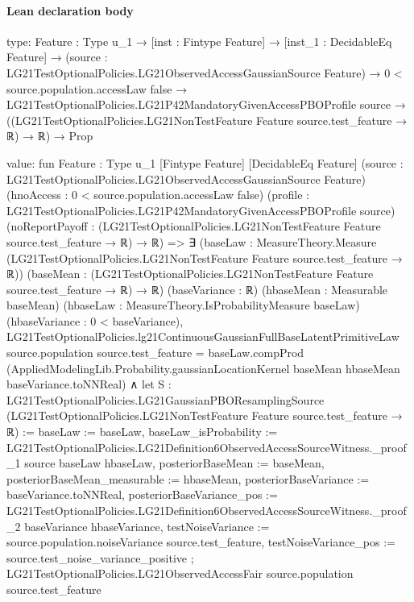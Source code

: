 \documentclass[10pt]{article}
\begin{document}
\paragraph{Lean declaration body}
\begin{ReviewVerbatim}
type:
{Feature : Type u_1} →
  [inst : Fintype Feature] →
    [inst_1 : DecidableEq Feature] →
      (source : LG21TestOptionalPolicies.LG21ObservedAccessGaussianSource Feature) →
        0 < source.population.accessLaw {false} →
          LG21TestOptionalPolicies.LG21P42MandatoryGivenAccessPBOProfile source →
            ((LG21TestOptionalPolicies.LG21NonTestFeature Feature source.test_feature → ℝ) → ℝ) → Prop

value:
fun {Feature : Type u_1} [Fintype Feature] [DecidableEq Feature]
    (source : LG21TestOptionalPolicies.LG21ObservedAccessGaussianSource Feature)
    (hnoAccess : 0 < source.population.accessLaw {false})
    (profile : LG21TestOptionalPolicies.LG21P42MandatoryGivenAccessPBOProfile source)
    (noReportPayoff : (LG21TestOptionalPolicies.LG21NonTestFeature Feature source.test_feature → ℝ) → ℝ) =>
  ∃ (baseLaw : MeasureTheory.Measure (LG21TestOptionalPolicies.LG21NonTestFeature Feature source.test_feature → ℝ))
    (baseMean : (LG21TestOptionalPolicies.LG21NonTestFeature Feature source.test_feature → ℝ) → ℝ) (baseVariance : ℝ)
    (hbaseMean : Measurable baseMean) (hbaseLaw : MeasureTheory.IsProbabilityMeasure baseLaw) (hbaseVariance :
    0 < baseVariance),
    LG21TestOptionalPolicies.lg21ContinuousGaussianFullBaseLatentPrimitiveLaw source.population source.test_feature =
        baseLaw.compProd
          (AppliedModelingLib.Probability.gaussianLocationKernel baseMean hbaseMean baseVariance.toNNReal) ∧
      let S :
        LG21TestOptionalPolicies.LG21GaussianPBOResamplingSource
          (LG21TestOptionalPolicies.LG21NonTestFeature Feature source.test_feature → ℝ) :=
        { baseLaw := baseLaw,
          baseLaw_isProbability :=
            LG21TestOptionalPolicies.LG21Definition6ObservedAccessSourceWitness._proof_1 source baseLaw hbaseLaw,
          posteriorBaseMean := baseMean, posteriorBaseMean_measurable := hbaseMean,
          posteriorBaseVariance := baseVariance.toNNReal,
          posteriorBaseVariance_pos :=
            LG21TestOptionalPolicies.LG21Definition6ObservedAccessSourceWitness._proof_2 baseVariance hbaseVariance,
          testNoiseVariance := source.population.noiseVariance source.test_feature,
          testNoiseVariance_pos := source.test_noise_variance_positive };
      LG21TestOptionalPolicies.LG21ObservedAccessFair source.population source.test_feature

\end{ReviewVerbatim}
\end{document}
